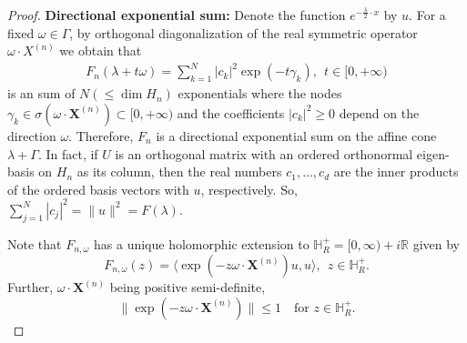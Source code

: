 \documentclass[11pt,reqno]{amsart}
\theoremstyle{plain}
\theoremstyle{definition}
\numberwithin{equation}{section}
\begin{document}
\begin{proof}
\vspace{2mm}

 \noindent \textbf{Directional exponential sum:} Denote the function $e^{-\frac{\lambda}{2} \cdot x}$ by $u$. For a fixed $\omega \in \Gamma$, by orthogonal diagonalization of the real symmetric operator $ \omega \cdot X^{(n)}$ we obtain that
	\begin{align}\label{Eq:dir-exp-sum}
	   F_n(\lambda + t \omega) = \sum_{k=1}^N |c_k|^2 \exp{(-t \gamma_k )}, \ \ t\in [0, +\infty) 
	\end{align}
    is an sum of $N ( \leq \dim H_n)$ exponentials where the nodes $\gamma_k \in \sigma (\omega \cdot \boldsymbol{X}^{(n)}) \subset [0, +\infty)$ and the coefficients $|c_k|^2 \geq 0$ depend on the direction $\omega$. Therefore, $F_n$ is a directional exponential sum on the affine cone $\lambda +\Gamma$.
    In fact, if $U$ is an orthogonal matrix with an ordered orthonormal eigen-basis on $H_n$ as its column, then the real numbers $c_1, \dots, c_d$ are the inner products of the ordered basis vectors with $u$, respectively. So, $\sum_{j=1}^N |c_j|^2 = \|u\|^2 = F(\lambda)$. 
    
     Note that $F_{n, \omega}$ has a unique holomorphic extension to $\mathbb{H}^+_R = [0,\infty) + i \mathbb{R}$ given by
    $$
    F_{n, \omega}(z) =  \langle \exp(- z \omega \cdot \boldsymbol{X}^{(n)})u, u \rangle, \ \ z\in \mathbb{H}^+_R.
    $$
    Further, $\omega \cdot \boldsymbol{X}^{(n)}$ being positive semi-definite,
    $$ \| \exp(-z  \omega \cdot \boldsymbol{X}^{(n)}) \| \leq 1 \quad \text{for } z\in \mathbb{H}^+_R.$$
    

\end{proof}
\end{document}
